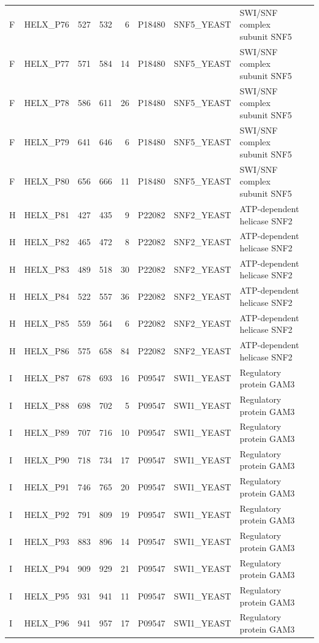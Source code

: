 \begin{longtable}{@{}llrrrrllp{5.2cm}@{}}
  F & HELX_P76 & 527 & 532 & 6 & P18480 & SNF5_YEAST & SWI/SNF complex subunit SNF5 \\
  F & HELX_P77 & 571 & 584 & 14 & P18480 & SNF5_YEAST & SWI/SNF complex subunit SNF5 \\
  F & HELX_P78 & 586 & 611 & 26 & P18480 & SNF5_YEAST & SWI/SNF complex subunit SNF5 \\
  F & HELX_P79 & 641 & 646 & 6 & P18480 & SNF5_YEAST & SWI/SNF complex subunit SNF5 \\
  F & HELX_P80 & 656 & 666 & 11 & P18480 & SNF5_YEAST & SWI/SNF complex subunit SNF5 \\
  H & HELX_P81 & 427 & 435 & 9 & P22082 & SNF2_YEAST & ATP-dependent helicase SNF2 \\
  H & HELX_P82 & 465 & 472 & 8 & P22082 & SNF2_YEAST & ATP-dependent helicase SNF2 \\
  H & HELX_P83 & 489 & 518 & 30 & P22082 & SNF2_YEAST & ATP-dependent helicase SNF2 \\
  H & HELX_P84 & 522 & 557 & 36 & P22082 & SNF2_YEAST & ATP-dependent helicase SNF2 \\
  H & HELX_P85 & 559 & 564 & 6 & P22082 & SNF2_YEAST & ATP-dependent helicase SNF2 \\
  H & HELX_P86 & 575 & 658 & 84 & P22082 & SNF2_YEAST & ATP-dependent helicase SNF2 \\
  I & HELX_P87 & 678 & 693 & 16 & P09547 & SWI1_YEAST & Regulatory protein GAM3 \\
  I & HELX_P88 & 698 & 702 & 5 & P09547 & SWI1_YEAST & Regulatory protein GAM3 \\
  I & HELX_P89 & 707 & 716 & 10 & P09547 & SWI1_YEAST & Regulatory protein GAM3 \\
  I & HELX_P90 & 718 & 734 & 17 & P09547 & SWI1_YEAST & Regulatory protein GAM3 \\
  I & HELX_P91 & 746 & 765 & 20 & P09547 & SWI1_YEAST & Regulatory protein GAM3 \\
  I & HELX_P92 & 791 & 809 & 19 & P09547 & SWI1_YEAST & Regulatory protein GAM3 \\
  I & HELX_P93 & 883 & 896 & 14 & P09547 & SWI1_YEAST & Regulatory protein GAM3 \\
  I & HELX_P94 & 909 & 929 & 21 & P09547 & SWI1_YEAST & Regulatory protein GAM3 \\
  I & HELX_P95 & 931 & 941 & 11 & P09547 & SWI1_YEAST & Regulatory protein GAM3 \\
  I & HELX_P96 & 941 & 957 & 17 & P09547 & SWI1_YEAST & Regulatory protein GAM3 \\

\end{longtable}
